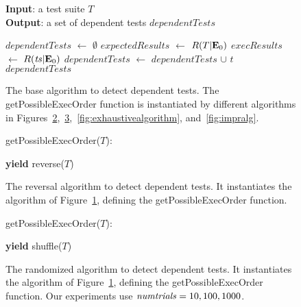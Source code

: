 \begin{figure}[t]
\textbf{Input}: a test suite $\mathit{T}$\\
\textbf{Output}: a set of dependent tests $\mathit{dependentTests}$\\
\bigsqueeze
\begin{algorithmic}[1]
\STATE $\mathit{dependentTests}$ $\leftarrow$ $\emptyset$
\STATE $\mathit{expectedResults}$ $\leftarrow$ $R(T|\mathbf{E}_0)$
\STATE $\mathit{execResults}$ $\leftarrow$ $R(\mathit{ts}|\mathbf{E}_0)$
\STATE $\mathit{dependentTests}$ $\leftarrow$ $\mathit{dependentTests}$ $\cup$ $\mathit{t}$
\ENDIF
\ENDFOR
\ENDFOR
\RETURN $\mathit{dependentTests}$
\end{algorithmic}


\caption {The base algorithm to detect dependent tests.
$\!$The getPossibleExecOrder function is instantiated
by different algorithms in
Figures~\ref{fig:reversal-algorithm},~$\!$\ref{fig:randalgorithm},~$\!$\ref{fig:exhaustivealgorithm},
and~\ref{fig:impralg}.
}
\label{fig:basealgorithm}
\end{figure}

\begin{figure}[t]
getPossibleExecOrder($T$):\\
\bigsqueeze
\begin{algorithmic}[1]
\STATE \textbf{yield} reverse($T$)
\end{algorithmic}

\caption {The reversal algorithm to detect dependent tests.
It instantiates the algorithm of Figure~\ref{fig:basealgorithm},
defining the getPossibleExecOrder function.
}
\label{fig:reversal-algorithm}
\end{figure}


\begin{figure}[t]
getPossibleExecOrder($T$):\\
\bigsqueeze
\begin{algorithmic}[1]
\STATE \textbf{yield} shuffle($T$)
\ENDFOR
\end{algorithmic}
\caption {The randomized algorithm to detect dependent tests.
It instantiates the algorithm of Figure~\ref{fig:basealgorithm}, defining
the getPossibleExecOrder function.
Our experiments use $\mathit{numtrials} = 10,
100, 1000$.}
\label{fig:randalgorithm}
\end{figure}

